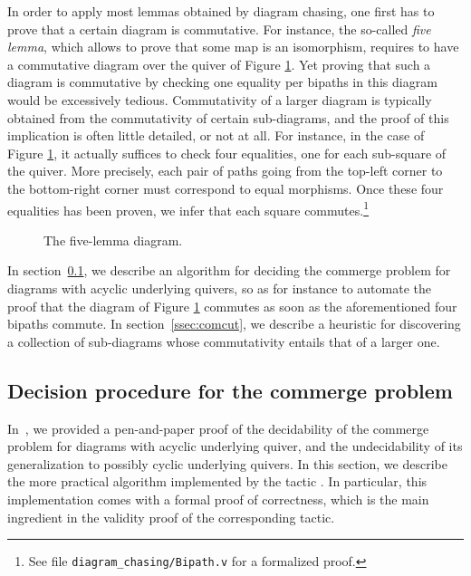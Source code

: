\documentclass[a4paper,UKenglish,cleveref, autoref, thm-restate]{lipics-v2021}
\begin{document}
In order to apply most lemmas obtained by diagram chasing, one first has to prove that a certain diagram is commutative. For instance, the so-called \emph{five lemma}, which allows to prove that some map is an isomorphism, requires to have a commutative diagram over the quiver of Figure \ref{fig:five-lemma}. Yet proving that such a diagram is commutative by checking one equality per bipaths in this diagram would be excessively tedious. Commutativity of a larger diagram is typically obtained from the commutativity of certain sub-diagrams, and the proof of this implication is often little detailed, or not at all. For instance, in the case of Figure \ref{fig:five-lemma}, it actually suffices to check four equalities, one for each sub-square of the quiver. More precisely, each pair of paths going from the top-left corner to the bottom-right corner must correspond to equal morphisms. Once these four equalities has been proven, we infer that each square commutes.\footnote{See file \texttt{diagram\_chasing/Bipath.v} for a formalized proof.}
\begin{figure}[h]
  \begin{center}
  \end{center}
  \caption{The five-lemma diagram. \label{fig:five-lemma}}
\end{figure}

In section~\ref{ssec:commerge}, we describe an algorithm for deciding the commerge problem for diagrams with acyclic underlying quivers, so as for instance to automate the proof that the diagram of Figure \ref{fig:five-lemma} commutes as soon as the aforementioned four bipaths commute. In section~\ref{ssec:comcut}, we describe a heuristic for discovering a collection of sub-diagrams whose commutativity entails that of a larger one.



\subsection{Decision procedure for the commerge problem}\label{ssec:commerge}

In~\cite{DBLP:conf/csl/MahboubiP24}, we provided a pen-and-paper proof of the decidability of the commerge problem for diagrams with acyclic underlying quiver, and the undecidability of its generalization to possibly cyclic underlying quivers. In this section, we describe the more practical algorithm implemented by the tactic . In particular, this implementation comes with a formal proof of correctness, which is the main ingredient in the validity proof of the corresponding tactic.
\end{document}
